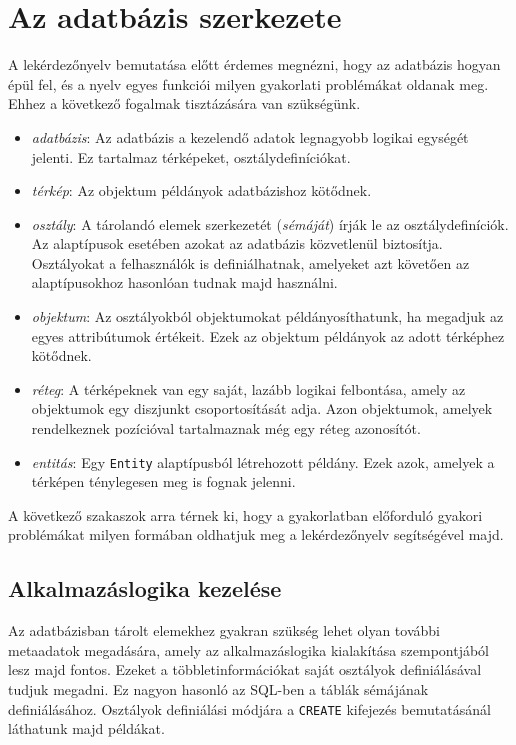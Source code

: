
\section{Az adatbázis szerkezete}

A lekérdezőnyelv bemutatása előtt érdemes megnézni, hogy az adatbázis hogyan épül fel, és a nyelv egyes funkciói milyen gyakorlati problémákat oldanak meg. Ehhez a következő fogalmak tisztázására van szükségünk.
\begin{itemize}
\item \textit{adatbázis}: Az adatbázis a kezelendő adatok legnagyobb logikai egységét jelenti. Ez tartalmaz térképeket, osztálydefiníciókat.
\item \textit{térkép}: Az objektum példányok adatbázishoz kötődnek.
\item \textit{osztály}: A tárolandó elemek szerkezetét (\textit{sémáját}) írják le az osztálydefiníciók. Az alaptípusok esetében azokat az adatbázis közvetlenül biztosítja. Osztályokat a felhasználók is definiálhatnak, amelyeket azt követően az alaptípusokhoz hasonlóan tudnak majd használni.
\item \textit{objektum}: Az osztályokból objektumokat példányosíthatunk, ha megadjuk az e\-gyes attribútumok értékeit. Ezek az objektum példányok az adott térképhez kötődnek.
\item \textit{réteg}: A térképeknek van egy saját, lazább logikai felbontása, amely az objektumok egy diszjunkt csoportosítását adja. Azon objektumok, amelyek rendelkeznek pozícióval tartalmaznak még egy réteg azonosítót.
\item \textit{entitás}: Egy \texttt{Entity} alaptípusból létrehozott példány. Ezek azok, amelyek a térképen ténylegesen meg is fognak jelenni.
\end{itemize}

A következő szakaszok arra térnek ki, hogy a gyakorlatban előforduló gyakori problémákat milyen formában oldhatjuk meg a lekérdezőnyelv segítségével majd.

\subsection{Alkalmazáslogika kezelése}

Az adatbázisban tárolt elemekhez gyakran szükség lehet olyan további metaadatok megadására, amely az alkalmazáslogika kialakítása szempontjából lesz majd fontos. Ezeket a többletinformációkat saját osztályok definiálásával tudjuk megadni. Ez nagyon hasonló az SQL-ben a táblák sémájának definiálásához. Osztályok definiálási módjára a \texttt{CREATE} kifejezés bemutatásánál láthatunk majd példákat.

